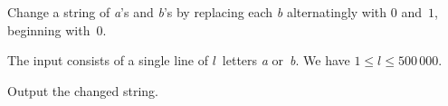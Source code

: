 
Change a string of \emph a's and \emph b's by replacing each \emph b alternatingly with $0$ and~$1$, beginning with~$0$.

\begin{Input}
    The input consists of a single line of $l$~letters \emph a or~\emph b.
    We have $1\leq l\leq 500\,000$.
\end{Input}

\begin{Output}
  Output the changed string.
\end{Output}
